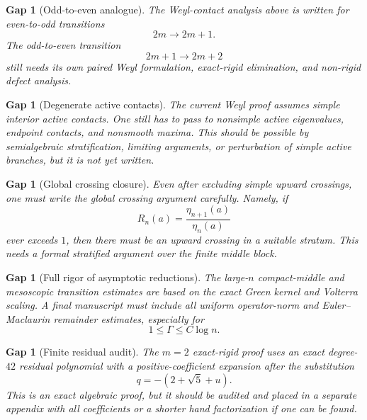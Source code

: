 \documentclass[11pt]{article}
\numberwithin{equation}{section}
\newtheorem{gap}[theorem]{Gap}
\begin{document}
\begin{gap}[Odd-to-even analogue]
The Weyl-contact analysis above is written for even-to-odd transitions
\[
2m\to2m+1.
\]
The odd-to-even transition
\[
2m+1\to2m+2
\]
still needs its own paired Weyl formulation, exact-rigid elimination, and non-rigid
defect analysis.
\end{gap}

\begin{gap}[Degenerate active contacts]
The current Weyl proof assumes simple interior active contacts. One still has to pass
to nonsimple active eigenvalues, endpoint contacts, and nonsmooth maxima. This should
be possible by semialgebraic stratification, limiting arguments, or perturbation of
simple active branches, but it is not yet written.
\end{gap}

\begin{gap}[Global crossing closure]
Even after excluding simple upward crossings, one must write the global crossing
argument carefully. Namely, if
\[
R_n(a)=\frac{\eta_{n+1}(a)}{\eta_n(a)}
\]
ever exceeds \(1\), then there must be an upward crossing in a suitable stratum.
This needs a formal stratified argument over the finite middle block.
\end{gap}

\begin{gap}[Full rigor of asymptotic reductions]
The large-\(n\) compact-middle and mesoscopic transition estimates are based on the
exact Green kernel and Volterra scaling. A final manuscript must include all uniform
operator-norm and Euler--Maclaurin remainder estimates, especially for
\[
1\le \Gamma\le C\log n.
\]
\end{gap}

\begin{gap}[Finite residual audit]
The \(m=2\) exact-rigid proof uses an exact degree-\(42\) residual polynomial with a
positive-coefficient expansion after the substitution
\[
q=-(2+\sqrt5+u).
\]
This is an exact algebraic proof, but it should be audited and placed in a separate
appendix with all coefficients or a shorter hand factorization if one can be found.
\end{gap}
\end{document}
